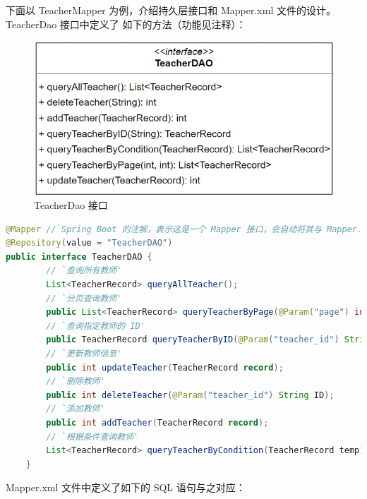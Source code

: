 \documentclass[12pt, a4paper]{article}
\begin{document}
下面以 TeacherMapper 为例，介绍持久层接口和 Mapper.xml 文件的设计。TeacherDao 接口中定义了
如下的方法（功能见注释）：
\begin{figure}[H]
	\centering
	\includegraphics[width = 0.6 \textwidth]{TeacherDao.png}
	\caption{TeacherDao 接口}
\end{figure}
\begin{lstlisting}[language = Java]
@Mapper //`Spring Boot 的注解，表示这是一个 Mapper 接口，会自动将其与 Mapper.xml 文件关联'
@Repository(value = "TeacherDAO")
public interface TeacherDAO {
		// `查询所有教师'
		List<TeacherRecord> queryAllTeacher();
		// `分页查询教师'
		public List<TeacherRecord> queryTeacherByPage(@Param("page") int page, @Param("size") int size);
		// `查询指定教师的 ID'
		public TeacherRecord queryTeacherByID(@Param("teacher_id") String ID);
		// `更新教师信息'
		public int updateTeacher(TeacherRecord record);
		// `删除教师'
		public int deleteTeacher(@Param("teacher_id") String ID);
		// `添加教师'
		public int addTeacher(TeacherRecord record);
		// `根据条件查询教师'
		List<TeacherRecord> queryTeacherByCondition(TeacherRecord temp);
	}
\end{lstlisting}
Mapper.xml 文件中定义了如下的 SQL 语句与之对应：
\end{document}

